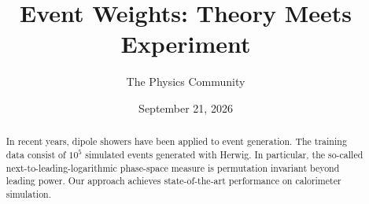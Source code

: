 \documentclass[11pt]{article}
\title{Event Weights: Theory Meets Experiment}
\author{The Physics Community}
\date{September 21, 2026}
\numberwithin{equation}{section}
\theoremstyle{definition}
\theoremstyle{remark}
\begin{document}
\maketitle
\begin{abstract}
In recent years, dipole showers have been applied to event generation.
The training data consist of $10^5$ simulated events generated with
Herwig. In particular, the so-called next-to-leading-logarithmic
phase-space measure is permutation invariant beyond leading power. Our
approach achieves state-of-the-art performance on calorimeter
simulation.
\end{abstract}
\tableofcontents



\nocite{*}


\end{document}
